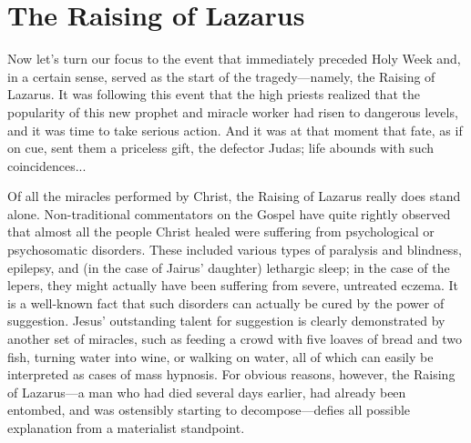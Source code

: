 \chapter*{The Raising of Lazarus}

Now let's turn our focus to the event that immediately preceded Holy Week and, in a certain sense, served as the start of the tragedy---namely, the Raising of Lazarus. It was following this event that the high priests realized that the popularity of this new prophet and miracle worker had risen to dangerous levels, and it was time to take serious action. And it was at that moment that fate, as if on cue, sent them a priceless gift, the defector Judas; life abounds with such coincidences...

Of all the miracles performed by Christ, the Raising of Lazarus really does stand alone. Non-traditional commentators on the Gospel have quite rightly observed that almost all the people Christ healed were suffering from psychological or psychosomatic disorders. These included various types of paralysis and blindness, epilepsy, and (in the case of Jairus' daughter) lethargic sleep; in the case of the lepers, they might actually have been suffering from severe, untreated eczema. It is a well-known fact that such disorders can actually be cured by the power of suggestion. Jesus' outstanding talent for suggestion is clearly demonstrated by another set of miracles, such as feeding a crowd with five loaves of bread and two fish, turning water into wine, or walking on water, all of which can easily be interpreted as cases of mass hypnosis. For obvious reasons, however, the Raising of Lazarus---a man who had died several days earlier, had already been entombed, and was ostensibly starting to decompose---defies all possible explanation from a materialist standpoint.

